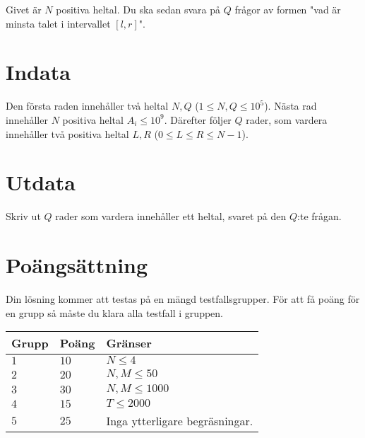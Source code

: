 Givet är $N$ positiva heltal. Du ska sedan svara på $Q$ frågor av formen "vad är minsta talet i intervallet $[l,r]$".


\section*{Indata}
Den första raden innehåller två heltal $N, Q$ ($1 \leq N,Q \leq 10^5 $).
Nästa rad innehåller $N$ positiva heltal $A_i \leq 10^9$.
Därefter följer $Q$ rader, som vardera innehåller två positiva heltal $L,R$ ($0 \leq L \leq R \leq N-1$).
\section*{Utdata}
Skriv ut $Q$ rader som vardera innehåller ett heltal, svaret på den $Q$:te frågan.

\section*{Poängsättning}
Din lösning kommer att testas på en mängd testfallsgrupper.
För att få poäng för en grupp så måste du klara alla testfall i gruppen.

\noindent
\begin{tabular}{| l | l | p{12cm} |}
  \hline
  \textbf{Grupp} & \textbf{Poäng} & \textbf{Gränser} \\ \hline
  $1$    & $10$      & $N \le 4$ \\ \hline
  $2$    & $20$      & $N, M \le 50$ \\ \hline
  $3$    & $30$      & $N, M \le 1000$ \\ \hline
  $4$    & $15$      & $T \le 2000$ \\ \hline
  $5$    & $25$      & Inga ytterligare begräsningar. \\ \hline
\end{tabular}
